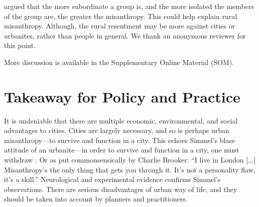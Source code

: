 \documentclass[11pt, letterpaper]{article}
\begin{document}
\begin{spacing}{1.4}
{
\citet{smith97} argued that the more subordinate a group is, and the more
isolated the members of the group are, the greater the misanthropy. %
 This could help explain rural misanthropy.  Although, the rural resentment may be more against
  cities or urbanites, rather than people in general. We thank an anonymous reviewer for this point. %
}


More discussion is available in the Supplementary Online Material (SOM).


\section*{Takeaway for Policy and Practice}

It is undeniable that there are multiple economic, environmental, and social
advantages to cities. %
 Cities are largely necessary, and so is perhaps urban misanthropy---to survive and function in a city. This echoes Simmel's blase attitude of an urbanite---in order to survive and function in a city, one must withdraw \citep{simmel03}. Or as put commonsensically by Charlie Brooker:
 ``I live in London [...] Misanthropy's the only thing that gets you
  through it. It's not a personality flaw, it's a skill.''
 Neurological \citep{lederbogen11} and experimental \citep{milgram70} evidence  confirms Simmel's observations. %
 There are serious
 disadvantages of urban way of life, and they should be taken into account by
 planners and practitioners. %
 



\end{spacing}
\end{document}
